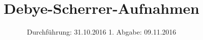 


\subject{Versuch 41}
\title{Debye-Scherrer-Aufnahmen}
\date{
  Durchführung: 31.10.2016
  \hspace{3em}
  1. Abgabe: 09.11.2016
}




\maketitle
\thispagestyle{empty}
\tableofcontents
\newpage

%
%


%

%

%



\printbibliography


